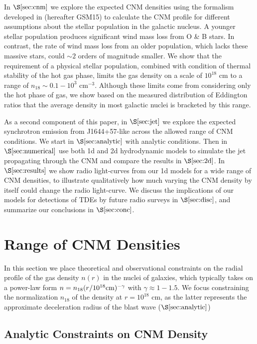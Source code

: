 \documentclass[usenatbib,fleqn]{mnras}
\begin{document}
In $\S\ref{sec:cnm}$ we explore the expected CNM densities using the
formalism developed in \citet{Generozov+2015} (hereafter GSM15) to
calculate the CNM profile for different assumptions about the stellar
population in the galactic nucleus.  A younger stellar population
produces significant wind mass loss from O \& B stars. In contrast,
the rate of wind mass loss from an older population, which lacks these
massive stars, could $\sim 2$ orders of magnitude smaller.  We show
that the requirement of a physical stellar population, combined with
condition of thermal stability of the hot gas phase, limits the gas
density on a scale of $10^{18}$ cm to a range of $n_{18} \sim
0.1-10^{3}$ cm$^{-3}$.  Although these limits come from considering
only the hot phase of gas, we show based on the measured distribution
of Eddington ratios that the average density in most galactic nuclei
is bracketed by this range. 

As a second component of this paper, in $\S\ref{sec:jet}$ we
explore the expected synchrotron emission from J1644+57-like across
the allowed range of CNM conditions.  We start in
$\S\ref{sec:analytic}$ with analytic conditions.  Then in
$\S\ref{sec:numerical}$ use both 1d and 2d hydrodynamic models to
simulate the jet propagating through the CNM and compare the results
in $\S\ref{sec:2d}$. In $\S\ref{sec:results}$ we show radio
light-curves from our 1d models for a wide range of CNM densities, to
illustrate qualitatively how much varying the CNM density by itself
could change the radio light-curve.  We discuss the implications of
our models for detections of TDEs by future radio surveys in
$\S\ref{sec:disc}$, and summarize our conclusions in
$\S\ref{sec:conc}$.

\section{Range of CNM Densities}
\label{sec:cnm}

In this section we place theoretical and observational constraints on
the radial profile of the gas density $n(r)$ in the nuclei of
galaxies, which typically takes on a power-law form $n =
n_{18}(r/10^{18}{\rm cm})^{-\gamma}$ with $\gamma \approx 1-1.5$.  We
focus constraining the normalization $n_{18}$ of the density at $r =
10^{18}$ cm, as the latter represents the approximate deceleration
radius of the blast wave ($\S\ref{sec:analytic}$)

\subsection{Analytic Constraints on CNM Density}
\end{document}
